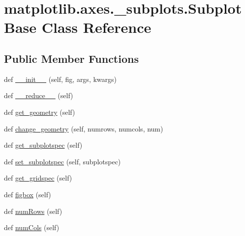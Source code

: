 \hypertarget{classmatplotlib_1_1axes_1_1__subplots_1_1SubplotBase}{}\section{matplotlib.\+axes.\+\_\+subplots.\+Subplot\+Base Class Reference}
\label{classmatplotlib_1_1axes_1_1__subplots_1_1SubplotBase}
\subsection*{Public Member Functions}
\begin{DoxyCompactItemize}
\item 
def \hyperlink{classmatplotlib_1_1axes_1_1__subplots_1_1SubplotBase_a831809abdb684c76bc0e4fefb0b29119}{\+\_\+\+\_\+init\+\_\+\+\_\+} (self, fig, args, kwargs)
\item 
def \hyperlink{classmatplotlib_1_1axes_1_1__subplots_1_1SubplotBase_a6adda293f5f19d94f7f5ca4b2ef75029}{\+\_\+\+\_\+reduce\+\_\+\+\_\+} (self)
\item 
def \hyperlink{classmatplotlib_1_1axes_1_1__subplots_1_1SubplotBase_a78df59a70657134973ccb1d8f18a333b}{get\+\_\+geometry} (self)
\item 
def \hyperlink{classmatplotlib_1_1axes_1_1__subplots_1_1SubplotBase_a9e55895271cf9fe38343c9a72cf460d9}{change\+\_\+geometry} (self, numrows, numcols, num)
\item 
def \hyperlink{classmatplotlib_1_1axes_1_1__subplots_1_1SubplotBase_a520c20acc9275059961174eb20152003}{get\+\_\+subplotspec} (self)
\item 
def \hyperlink{classmatplotlib_1_1axes_1_1__subplots_1_1SubplotBase_ad44832f3682e9fef9dba4818fa5d0783}{set\+\_\+subplotspec} (self, subplotspec)
\item 
def \hyperlink{classmatplotlib_1_1axes_1_1__subplots_1_1SubplotBase_ae7df39f7ff5af073be5be36fe1f3bb45}{get\+\_\+gridspec} (self)
\item 
def \hyperlink{classmatplotlib_1_1axes_1_1__subplots_1_1SubplotBase_a0c116a941d5765c2e6186d934d8be186}{figbox} (self)
\item 
def \hyperlink{classmatplotlib_1_1axes_1_1__subplots_1_1SubplotBase_a815965f5254620df4664771b324d6eba}{num\+Rows} (self)
\item 
def \hyperlink{classmatplotlib_1_1axes_1_1__subplots_1_1SubplotBase_acafc62321f5d48ef2f6dee7f26f0195b}{num\+Cols} (self)
\item 

\end{DoxyCompactItemize}
